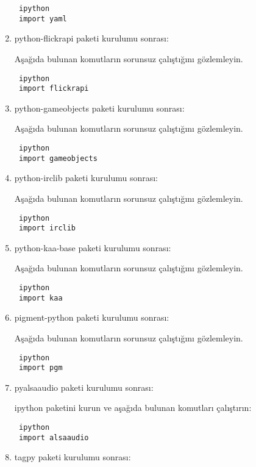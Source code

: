 \documentclass[a4paper,10pt]{article}
\begin{document}
\begin{enumerate}
\begin{verbatim}
 ipython
 import yaml
\end{verbatim}

\item python-flickrapi paketi kurulumu sonrası:

Aşağıda bulunan komutların sorunsuz çalıştığını gözlemleyin.

\begin{verbatim}
 ipython
 import flickrapi
\end{verbatim}

\item python-gameobjects paketi kurulumu sonrası:

Aşağıda bulunan komutların sorunsuz çalıştığını gözlemleyin.

\begin{verbatim}
 ipython
 import gameobjects
\end{verbatim}

\item python-irclib paketi kurulumu sonrası:

Aşağıda bulunan komutların sorunsuz çalıştığını gözlemleyin.

\begin{verbatim}
 ipython
 import irclib
\end{verbatim}

\item python-kaa-base paketi kurulumu sonrası:

Aşağıda bulunan komutların sorunsuz çalıştığını gözlemleyin.

\begin{verbatim}
 ipython
 import kaa
\end{verbatim}

\item pigment-python paketi kurulumu sonrası:

Aşağıda bulunan komutların sorunsuz çalıştığını gözlemleyin.

\begin{verbatim}
 ipython
 import pgm
\end{verbatim}

\item pyalsaaudio paketi kurulumu sonrası:

ipython paketini kurun ve aşağıda bulunan komutları çalıştırın:
\begin{verbatim}
 ipython
 import alsaaudio
\end{verbatim}

\item tagpy paketi kurulumu sonrası:


\end{enumerate}
\end{document}
